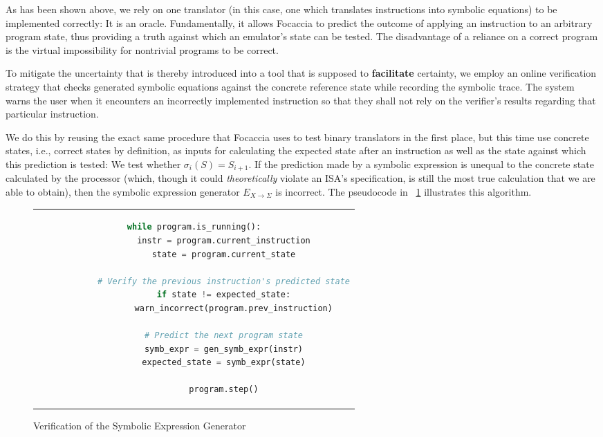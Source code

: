As has been shown above, we rely on one translator (in this case, one which translates instructions into symbolic
equations) to be implemented correctly: It is an oracle. Fundamentally, it allows Focaccia to predict the outcome of
applying an instruction to an arbitrary program state, thus providing a truth against which an emulator's state can be
tested. The disadvantage of a reliance on a correct program is the virtual impossibility for nontrivial programs to be
correct.

To mitigate the uncertainty that is thereby introduced into a tool that is supposed to \textbf{facilitate} certainty, we
employ an online verification strategy that checks generated symbolic equations against the concrete reference state
while recording the symbolic trace. The system warns the user when it encounters an incorrectly implemented instruction
so that they shall not rely on the verifier's results regarding that particular instruction.

We do this by reusing the exact same procedure that Focaccia uses to test binary translators in the first place, but
this time use concrete states, i.e., correct states by definition, as inputs for calculating the expected state after an
instruction as well as the state against which this prediction is tested: We test whether $\sigma_i(S) = S_{i+1}$. If
the prediction made by a symbolic expression is unequal to the concrete state calculated by the processor (which, though
it could \textit{theoretically} violate an \ac{ISA}'s specification, is still the most true calculation that we are able
to obtain), then the symbolic expression generator $E_{X \rightarrow \Sigma}$ is incorrect. The pseudocode in
\figurename~\ref{fig:symb_generator_verification} illustrates this algorithm.

\begin{figure}[htbp]
    \centering
    \begin{tabular}{c}
    \begin{lstlisting}[language=Python]
        while program.is_running():
            instr = program.current_instruction
            state = program.current_state

            # Verify the previous instruction's predicted state
            if state != expected_state:
                warn_incorrect(program.prev_instruction)

            # Predict the next program state
            symb_expr = gen_symb_expr(instr)
            expected_state = symb_expr(state)

            program.step()
    \end{lstlisting}
    \end{tabular}
    \caption{Verification of the Symbolic Expression Generator}\label{fig:symb_generator_verification}
\end{figure}

